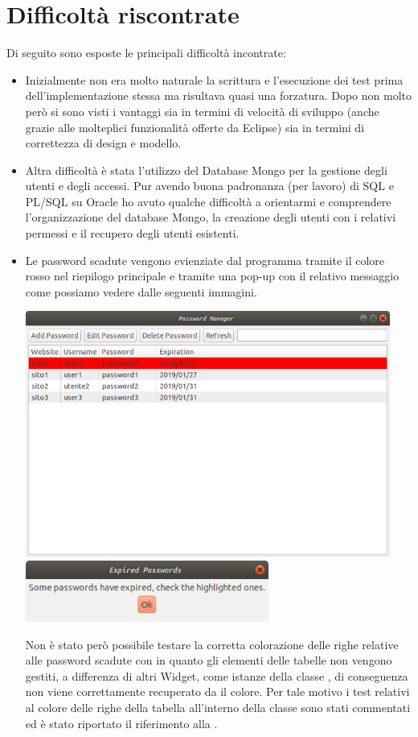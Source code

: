 \chapter{Difficoltà riscontrate}
Di seguito sono esposte le principali difficoltà incontrate:
\begin{itemize}
	\item Inizialmente non era molto naturale la scrittura e l'esecuzione dei test prima dell'implementazione stessa ma risultava quasi una forzatura. Dopo non molto però si sono visti i vantaggi sia in termini di velocità di sviluppo (anche grazie alle molteplici funzionalità offerte da Eclipse) sia in termini di correttezza di design e modello.
	\item Altra difficoltà è stata l'utilizzo del Database Mongo per la gestione degli utenti e degli accessi. Pur avendo buona padronanza (per lavoro) di SQL e PL/SQL su Oracle ho avuto qualche difficoltà a orientarmi e comprendere l'organizzazione del database Mongo, la creazione degli utenti con i relativi  permessi e il recupero degli utenti esistenti.
	\item Le password scadute vengono evienziate dal programma tramite il colore rosso nel riepilogo principale e tramite una pop-up con il relativo messaggio come possiamo vedere dalle seguenti immagini. 
	\begin{center}
		\includegraphics[width=12cm]{Immagini/Expired.png}
		\includegraphics[width=8cm]{Immagini/ExpiredMsg.png}	
	\end{center}
	Non è stato però possibile testare la corretta colorazione delle righe relative alle password scadute con  in quanto gli elementi delle tabelle non vengono gestiti, a differenza di altri Widget, come istanze della classe , di conseguenza non viene correttamente recuperato da  il colore. Per tale motivo i test relativi al colore delle righe della tabella all'interno della classe  sono stati commentati ed è stato riportato il riferimento alla .

\end{itemize}
